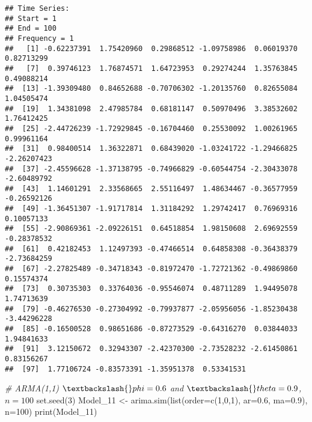 \documentclass[
]{article}
\newenvironment{Shaded}{\begin{snugshade}}{\end{snugshade}}
\newcommand{\AttributeTok}[1]{\textcolor[rgb]{0.77,0.63,0.00}{#1}}
\newcommand{\CommentTok}[1]{\textcolor[rgb]{0.56,0.35,0.01}{\textit{#1}}}
\newcommand{\DecValTok}[1]{\textcolor[rgb]{0.00,0.00,0.81}{#1}}
\newcommand{\FloatTok}[1]{\textcolor[rgb]{0.00,0.00,0.81}{#1}}
\newcommand{\FunctionTok}[1]{\textcolor[rgb]{0.00,0.00,0.00}{#1}}
\newcommand{\NormalTok}[1]{#1}
\newcommand{\OtherTok}[1]{\textcolor[rgb]{0.56,0.35,0.01}{#1}}
\begin{document}
\begin{verbatim}
## Time Series:
## Start = 1 
## End = 100 
## Frequency = 1 
##   [1] -0.62237391  1.75420960  0.29868512 -1.09758986  0.06019370  0.82713299
##   [7]  0.39746123  1.76874571  1.64723953  0.29274244  1.35763845  0.49088214
##  [13] -1.39309480  0.84652688 -0.70706302 -1.20135760  0.82655084  1.04505474
##  [19]  1.34381098  2.47985784  0.68181147  0.50970496  3.38532602  1.76412425
##  [25] -2.44726239 -1.72929845 -0.16704460  0.25530092  1.00261965  0.99961164
##  [31]  0.98400514  1.36322871  0.68439020 -1.03241722 -1.29466825 -2.26207423
##  [37] -2.45596628 -1.37138795 -0.74966829 -0.60544754 -2.30433078 -2.60489792
##  [43]  1.14601291  2.33568665  2.55116497  1.48634467 -0.36577959 -0.26592126
##  [49] -1.36451307 -1.91717814  1.31184292  1.29742417  0.76969316  0.10057133
##  [55] -2.90869361 -2.09226151  0.64518854  1.98150608  2.69692559 -0.28378532
##  [61]  0.42182453  1.12497393 -0.47466514  0.64858308 -0.36438379 -2.73684259
##  [67] -2.27825489 -0.34718343 -0.81972470 -1.72721362 -0.49869860  0.15574374
##  [73]  0.30735303  0.33764036 -0.95546074  0.48711289  1.94495078  1.74713639
##  [79] -0.46276530 -0.27304992 -0.79937877 -2.05956056 -1.85230438 -3.44296228
##  [85] -0.16500528  0.98651686 -0.87273529 -0.64316270  0.03844033  1.94841633
##  [91]  3.12150672  0.32943307 -2.42370300 -2.73528232 -2.61450861  0.83156267
##  [97]  1.77106724 -0.83573391 -1.35951378  0.53341531
\end{verbatim}

\begin{Shaded}
\begin{Highlighting}[]
\CommentTok{\# ARMA(1,1) $\textbackslash{}phi=0.6$ and $\textbackslash{}theta= 0.9$, $n=100$}
\FunctionTok{set.seed}\NormalTok{(}\DecValTok{3}\NormalTok{)}
\NormalTok{Model\_11 }\OtherTok{\textless{}{-}} \FunctionTok{arima.sim}\NormalTok{(}\FunctionTok{list}\NormalTok{(}\AttributeTok{order=}\FunctionTok{c}\NormalTok{(}\DecValTok{1}\NormalTok{,}\DecValTok{0}\NormalTok{,}\DecValTok{1}\NormalTok{), }\AttributeTok{ar=}\FloatTok{0.6}\NormalTok{, }\AttributeTok{ma=}\FloatTok{0.9}\NormalTok{), }\AttributeTok{n=}\DecValTok{100}\NormalTok{)}
\FunctionTok{print}\NormalTok{(Model\_11)}
\end{Highlighting}
\end{Shaded}
\end{document}
